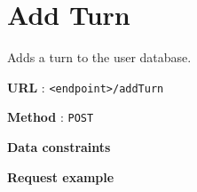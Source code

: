 \begin{Shaded}
\begin{Highlighting}[]
                        \NormalTok{,}
                        \NormalTok{,}
                        \NormalTok{,}
                        \NormalTok{,}
                        \NormalTok{,}
                        \NormalTok{,}
                        \NormalTok{,}
                     \NormalTok{],}
                     \NormalTok{:[}
                     \NormalTok{],}
                     \NormalTok{:\{}
                        \NormalTok{:}\NormalTok{,}
                        \NormalTok{:}\NormalTok{,}
                        \NormalTok{:}\NormalTok{,}
                        \NormalTok{:}
                     \NormalTok{\}}
                  \NormalTok{\}}
               \NormalTok{\}}
            \NormalTok{\}}
         \NormalTok{\},}
      \NormalTok{\}}
   \NormalTok{\}}
\NormalTok{\}}
\end{Highlighting}
\end{Shaded}

\section{Add Turn}\label{add-turn}

Adds a turn to the user database.

\textbf{URL} : \texttt{\textless{}endpoint\textgreater{}/addTurn}

\textbf{Method} : \texttt{POST}

\textbf{Data constraints}

\begin{Shaded}
\begin{Highlighting}[]
\NormalTok{\{}
  \NormalTok{: }
\NormalTok{\}}
\end{Highlighting}
\end{Shaded}

\textbf{Request example}

